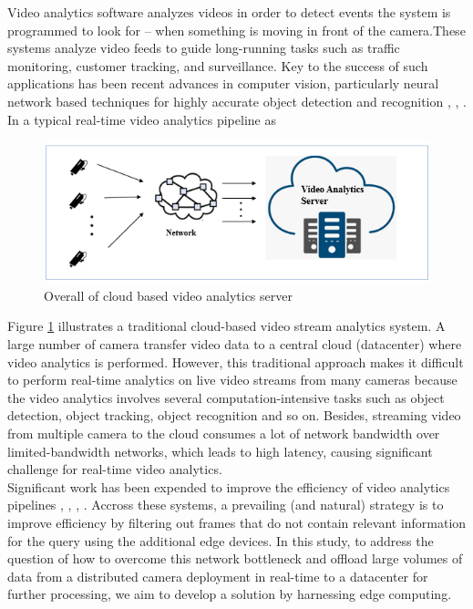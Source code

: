Video analytics software analyzes videos in order to detect events the system is programmed to look for – when something is moving in front of the camera.These systems analyze video feeds to guide long-running tasks such as traffic monitoring, customer tracking, and surveillance. Key to the success of such applications has been recent advances in computer vision, particularly neural network based techniques for highly accurate object detection and recognition \cite{cai2015learning}, \cite{krizhevsky2017imagenet}, \cite{li2015convolutional}.\\
In a typical real-time video analytics pipeline as 
\begin{figure}
\centering
 \includegraphics[width=1.0\linewidth]{Figures/cloud.png}
 \caption{Overall of cloud based video analytics server}
 \label{fig:overall}
\end{figure}
Figure \ref{fig:overall} illustrates a traditional cloud-based video stream analytics system. A large number of camera transfer video data to a central cloud (datacenter) where video analytics is performed. However, this traditional approach makes it difficult to perform real-time analytics on live video streams from many cameras because the video analytics involves several computation-intensive tasks such as object detection, object tracking, object recognition and so on. Besides, streaming video from multiple camera to the cloud consumes a lot of network bandwidth over limited-bandwidth networks, which leads to high latency, causing significant challenge for real-time video analytics.\\
Significant work has been expended to improve the efficiency of video analytics pipelines \cite{canel2019scaling}, \cite{chen2015glimpse}, \cite{hsieh2018focus}, \cite{jiang2018chameleon}. Accross these systems, a prevailing (and natural) strategy is to improve efficiency by filtering out frames that do not contain relevant information for the query using the additional edge devices. In this study, to address the question of how to overcome this network bottleneck and offload large volumes of data from a distributed camera deployment in real-time to a datacenter for further processing, we aim to develop a solution by harnessing edge computing.

